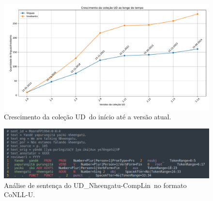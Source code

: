 \documentclass[portuguese]{textolivre}
\newcommand{\udc}{coleção UD}
\newcommand{\tbc}{UD\_Nheengatu-CompLin}
\newcommand{\conll}{CoNLL-U}
\begin{document}
\begin{figure}[htbp]
  \centering
  \begin{minipage}{\textwidth}
    \includegraphics[width=\linewidth]{figures/CrescimentoUD.pdf}
    \caption{Crescimento da \udc~do início até a versão atual.}
    \label{fig:crescimento}
  \end{minipage}
\end{figure}

\begin{figure}[htbp]
  \centering
  \begin{minipage}{.7\textwidth}
    \includegraphics[width=\linewidth]{figures/moore-4-conllu.pdf}
    \caption{Análise de sentença do \tbc~no formato \conll.}
    \label{fig:conllu}
  \end{minipage}
\end{figure}
\end{document}

